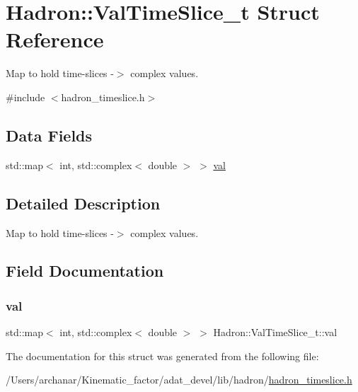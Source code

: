 \hypertarget{structHadron_1_1ValTimeSlice__t}{}\section{Hadron\+:\+:Val\+Time\+Slice\+\_\+t Struct Reference}
\label{structHadron_1_1ValTimeSlice__t}


Map to hold time-\/slices -\/$>$ complex values.  




{\ttfamily \#include $<$hadron\+\_\+timeslice.\+h$>$}

\subsection*{Data Fields}
\begin{DoxyCompactItemize}
\item 
std\+::map$<$ int, std\+::complex$<$ double $>$ $>$ \mbox{\hyperlink{structHadron_1_1ValTimeSlice__t_a4dbe94564e02d7c73010153fc1bc227f}{val}}
\end{DoxyCompactItemize}


\subsection{Detailed Description}
Map to hold time-\/slices -\/$>$ complex values. 

\subsection{Field Documentation}
\mbox{\label{structHadron_1_1ValTimeSlice__t_a4dbe94564e02d7c73010153fc1bc227f}} 
\subsubsection{\texorpdfstring{val}{val}}
{\footnotesize\ttfamily std\+::map$<$ int, std\+::complex$<$ double $>$ $>$ Hadron\+::\+Val\+Time\+Slice\+\_\+t\+::val}



The documentation for this struct was generated from the following file\+:\begin{DoxyCompactItemize}
\item 
/\+Users/archanar/\+Kinematic\+\_\+factor/adat\+\_\+devel/lib/hadron/\mbox{\hyperlink{lib_2hadron_2hadron__timeslice_8h}{hadron\+\_\+timeslice.\+h}}\end{DoxyCompactItemize}
